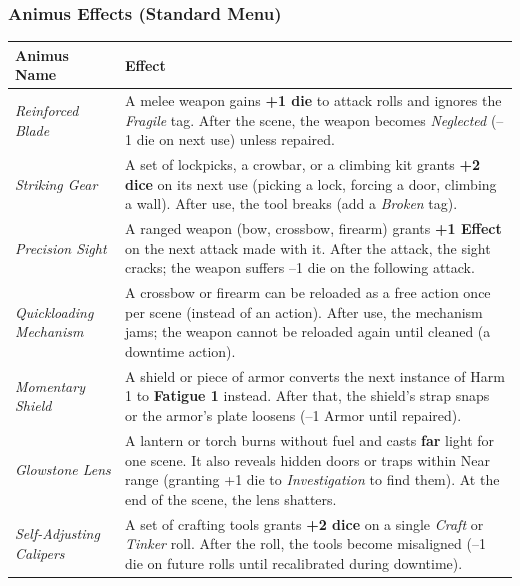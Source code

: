 \subsubsection*{Animus Effects (Standard Menu)}
\begin{longtable}{|p{}|p{}|}
\hline
\textbf{Animus Name} & \textbf{Effect} \\
\hline
\textit{Reinforced Blade} & A melee weapon gains \textbf{+1 die} to attack rolls and ignores the \textit{Fragile} tag. After the scene, the weapon becomes \textit{Neglected} (--1 die on next use) unless repaired. \\
\hline
\textit{Striking Gear} & A set of lockpicks, a crowbar, or a climbing kit grants \textbf{+2 dice} on its next use (picking a lock, forcing a door, climbing a wall). After use, the tool breaks (add a \textit{Broken} tag). \\
\hline
\textit{Precision Sight} & A ranged weapon (bow, crossbow, firearm) grants \textbf{+1 Effect} on the next attack made with it. After the attack, the sight cracks; the weapon suffers --1 die on the following attack. \\
\hline
\textit{Quickloading Mechanism} & A crossbow or firearm can be reloaded as a free action once per scene (instead of an action). After use, the mechanism jams; the weapon cannot be reloaded again until cleaned (a downtime action). \\
\hline
\textit{Momentary Shield} & A shield or piece of armor converts the next instance of Harm 1 to \textbf{Fatigue 1} instead. After that, the shield's strap snaps or the armor's plate loosens (--1 Armor until repaired). \\
\hline
\textit{Glowstone Lens} & A lantern or torch burns without fuel and casts \textbf{far} light for one scene. It also reveals hidden doors or traps within Near range (granting +1 die to \textit{Investigation} to find them). At the end of the scene, the lens shatters. \\
\hline
\textit{Self-Adjusting Calipers} & A set of crafting tools grants \textbf{+2 dice} on a single \textit{Craft} or \textit{Tinker} roll. After the roll, the tools become misaligned (--1 die on future rolls until recalibrated during downtime). \\
\hline
\end{longtable}

